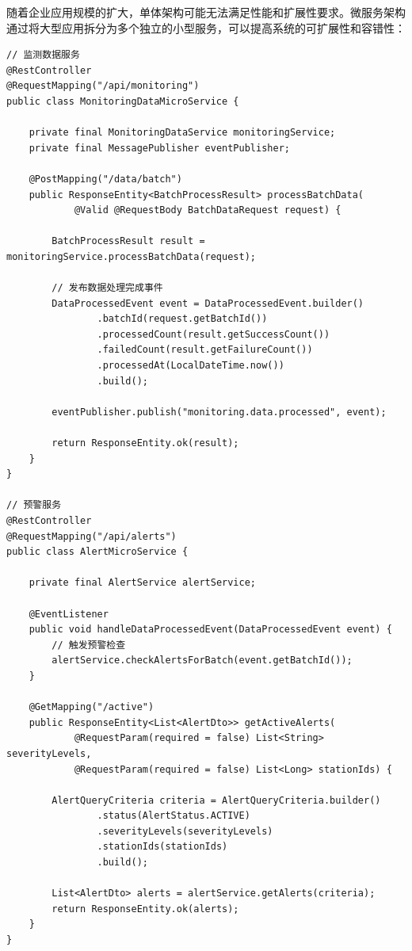 随着企业应用规模的扩大，单体架构可能无法满足性能和扩展性要求。微服务架构通过将大型应用拆分为多个独立的小型服务，可以提高系统的可扩展性和容错性：

\begin{lstlisting}[style=java]
// 监测数据服务
@RestController
@RequestMapping("/api/monitoring")
public class MonitoringDataMicroService {
    
    private final MonitoringDataService monitoringService;
    private final MessagePublisher eventPublisher;
    
    @PostMapping("/data/batch")
    public ResponseEntity<BatchProcessResult> processBatchData(
            @Valid @RequestBody BatchDataRequest request) {
        
        BatchProcessResult result = monitoringService.processBatchData(request);
        
        // 发布数据处理完成事件
        DataProcessedEvent event = DataProcessedEvent.builder()
                .batchId(request.getBatchId())
                .processedCount(result.getSuccessCount())
                .failedCount(result.getFailureCount())
                .processedAt(LocalDateTime.now())
                .build();
                
        eventPublisher.publish("monitoring.data.processed", event);
        
        return ResponseEntity.ok(result);
    }
}

// 预警服务  
@RestController
@RequestMapping("/api/alerts")
public class AlertMicroService {
    
    private final AlertService alertService;
    
    @EventListener
    public void handleDataProcessedEvent(DataProcessedEvent event) {
        // 触发预警检查
        alertService.checkAlertsForBatch(event.getBatchId());
    }
    
    @GetMapping("/active")
    public ResponseEntity<List<AlertDto>> getActiveAlerts(
            @RequestParam(required = false) List<String> severityLevels,
            @RequestParam(required = false) List<Long> stationIds) {
        
        AlertQueryCriteria criteria = AlertQueryCriteria.builder()
                .status(AlertStatus.ACTIVE)
                .severityLevels(severityLevels)
                .stationIds(stationIds)
                .build();
                
        List<AlertDto> alerts = alertService.getAlerts(criteria);
        return ResponseEntity.ok(alerts);
    }
}


\end{lstlisting}
